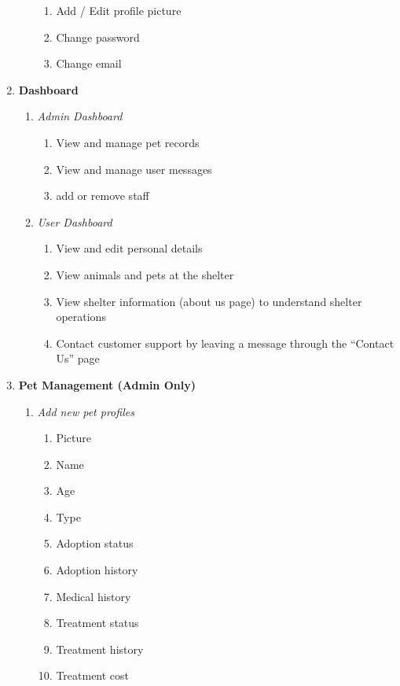 \begin{enumerate}
\begin{enumerate}
\begin{enumerate}
            \item Add / Edit profile picture
            \item Change password
            \item Change email
        \end{enumerate}
    \end{enumerate}
    \item \textbf{Dashboard} \begin{enumerate}
        \item \textit{Admin Dashboard} \begin{enumerate}
            \item View and manage pet records
            \item View and manage user messages
            \item add or remove staff
        \end{enumerate}
        \item \textit{User Dashboard} \begin{enumerate}
            \item View and edit personal details
            \item View animals and pets at the shelter
            \item View shelter information (about us page) to understand shelter operations
            \item Contact customer support by leaving a message through the ``Contact Us'' page
        \end{enumerate}
    \end{enumerate}
    \item \textbf{Pet Management (Admin Only)} \begin{enumerate}
        \item \textit{Add new pet profiles} \begin{enumerate}
            \item Picture
            \item Name
            \item Age
            \item Type
            \item Adoption status
            \item Adoption history
            \item Medical history
            \item Treatment status
            \item Treatment history
            \item Treatment cost

\end{enumerate}
\end{enumerate}
\end{enumerate}
